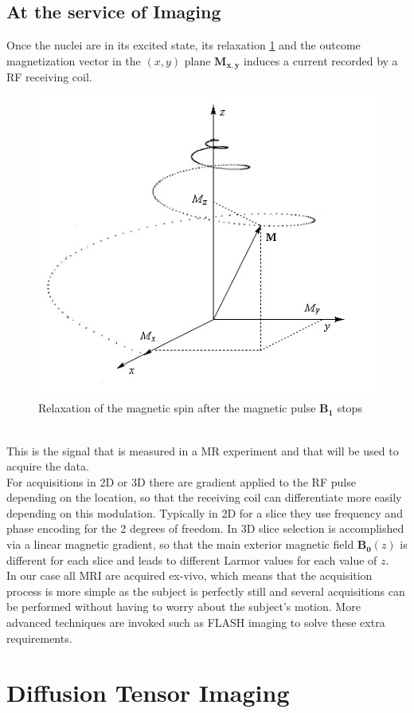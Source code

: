\subsection{At the service of Imaging}

Once the nuclei are in its excited state, its relaxation \ref{fig:spin_relaxation} and the outcome magnetization vector in the $(x, y)$ plane $\mathbf{M_{x, y}}$ induces a current recorded by a RF receiving coil.
\begin{figure}[h!]
    \centering
    \includegraphics[width=.5\textwidth]{figures/spin_relaxation}
    \caption{Relaxation of the magnetic spin after the magnetic pulse $\mathbf{B_1}$ stops}
    \label{fig:spin_relaxation}
\end{figure}
\\
This is the signal that is measured in a MR experiment and that will be used to acquire the data.\\
For acquisitions in 2D or 3D there are gradient applied to the RF pulse depending on the location, so that the receiving coil can differentiate more easily depending on this modulation. Typically in 2D for a slice they use frequency and phase encoding for the 2 degrees of freedom. In 3D slice selection is accomplished via a linear magnetic gradient, so that the main exterior magnetic field $\mathbf{B_0}(z)$ is different for each slice and leads to different Larmor values for each value of $z$.\\
In our case all MRI are acquired ex-vivo, which means that the acquisition process is more simple as the subject is perfectly still and several acquisitions can be performed without having to worry about the subject's motion. More advanced techniques are invoked such as FLASH imaging to solve these extra requirements.

\section{Diffusion Tensor Imaging}

